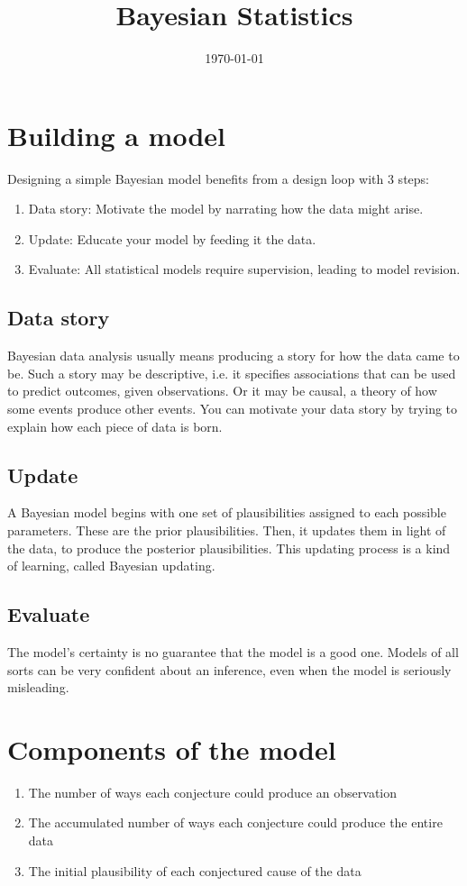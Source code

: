 \documentclass[11pt]{article}
\date{\today}
\title{Bayesian Statistics}
\begin{document}
\maketitle
\tableofcontents


\section{Building a model}
\label{sec:orgdc0c2bd}
Designing a simple Bayesian model benefits from a design loop with 3 steps:
\begin{enumerate}
\item Data story: Motivate the model by narrating how the data might arise.
\item Update: Educate your model by feeding it the data.
\item Evaluate: All statistical models require supervision, leading to model revision.
\end{enumerate}
\subsection{Data story}
\label{sec:orgdee63bd}
Bayesian data analysis usually means producing a story for how the data came to be.
Such a story may be descriptive, i.e. it specifies associations that can be used
to predict outcomes, given observations.
Or it may be causal, a theory of how some events produce other events.
You can motivate your data story by trying to explain how each piece of data is
born.
\subsection{Update}
\label{sec:org304cf9a}
A Bayesian model begins with one set of plausibilities assigned to each possible
parameters. These are the prior plausibilities. Then, it
updates them in light of the data, to produce the posterior plausibilities. This
updating process is a kind of learning, called Bayesian updating.
\subsection{Evaluate}
\label{sec:org064aaba}
The model's certainty is no guarantee that the model is a good one. Models of
all sorts can be very confident about an inference, even when the model is
seriously misleading.
\section{Components of the model}
\label{sec:org1ff6b47}
\begin{enumerate}
\item The number of ways each conjecture could produce an observation
\item The accumulated number of ways each conjecture could produce the entire data
\item The initial plausibility of each conjectured cause of the data
\end{enumerate}
\end{document}
